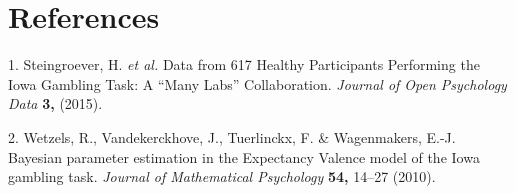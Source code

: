 \documentclass[11pt,,]{article}
\begin{document}
\section*{References}\label{references}

\hypertarget{refs}{}
\hypertarget{ref-steingroever_data_2015}{}
1. Steingroever, H. \emph{et al.} Data from 617 Healthy Participants
Performing the Iowa Gambling Task: A ``Many Labs'' Collaboration.
\emph{Journal of Open Psychology Data} \textbf{3,} (2015).

\hypertarget{ref-wetzels_bayesian_2010}{}
2. Wetzels, R., Vandekerckhove, J., Tuerlinckx, F. \& Wagenmakers, E.-J.
Bayesian parameter estimation in the Expectancy Valence model of the
Iowa gambling task. \emph{Journal of Mathematical Psychology}
\textbf{54,} 14--27 (2010).
\end{document}
